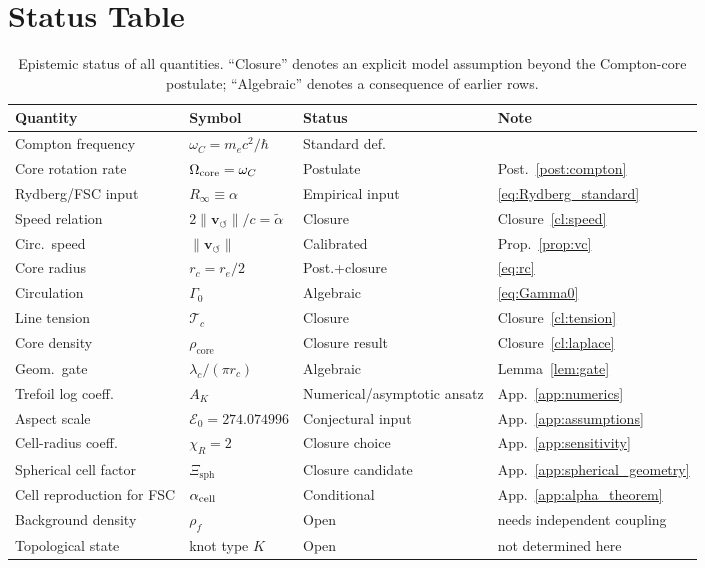 \documentclass[aps,pra,preprint,longbibliography,nofootinbib]{revtex4-2}
\newcommand{\vnorm}{\lVert\mathbf{v}_{\!\boldsymbol{\circlearrowleft}}\rVert} %
\newcommand{\rhof}{\rho_{\!f}}                   %
\newcommand{\rhocore}{\rho_{\mathrm{core}}}      %
\newcommand{\rc}{r_c}                            %
\newcommand{\omC}{\omega_C}                      %
\newcommand{\lc}{\lambda_c}                      %
\newcommand{\Rinf}{R_\infty}                     %
\newcommand{\Tc}{\mathcal{T}_c}                  %
\newcommand{\Gz}{\Gamma_0}                       %
\newcommand{\Et}{\mathcal{E}_0}                    %
\newcommand{\AK}{A_K}                                %
\newcommand{\Xsph}{\Xi_{\mathrm{sph}}}             %
\newcommand{\chiR}{\chi_R}                         %
\begin{document}
\section{Status Table}
\label{sec:status}

\begin{table}[h]
\centering
\caption{Epistemic status of all quantities.  ``Closure'' denotes an
explicit model assumption beyond the Compton-core postulate; ``Algebraic''
denotes a consequence of earlier rows.}
\label{tab:status}
\begin{tabular}{llll}
\toprule
Quantity & Symbol & Status & Note \\
\midrule
Compton frequency  & $\omC = m_e c^2/\hbar$     & Standard def.  & \cite{MohrTaylor2022} \\
Core rotation rate & $\Omega_{\rm core}=\omC$   & Postulate       & Post.~\ref{post:compton} \\
Rydberg/FSC input  & $\Rinf\equiv\alpha$        & Empirical input & \eqref{eq:Rydberg_standard} \\
Speed relation     & $2\vnorm/c=\tilde\alpha$   & Closure         & Closure~\ref{cl:speed} \\
Circ.\ speed       & $\vnorm$                   & Calibrated      & Prop.~\ref{prop:vc} \\
Core radius        & $\rc = r_e/2$              & Post.+closure   & \eqref{eq:rc} \\
Circulation        & $\Gz$                      & Algebraic       & \eqref{eq:Gamma0} \\
Line tension       & $\Tc$                      & Closure         & Closure~\ref{cl:tension} \\
Core density       & $\rhocore$                 & Closure result  & Closure~\ref{cl:laplace} \\
Geom.\ gate        & $\lc/(\pi\rc)$             & Algebraic       & Lemma~\ref{lem:gate} \\
Trefoil log coeff. & $\AK$                      & Numerical/asymptotic ansatz & App.~\ref{app:numerics} \\
Aspect scale       & $\Et=274.074996$          & Conjectural input & App.~\ref{app:assumptions} \\
Cell-radius coeff. & $\chiR=2$                  & Closure choice & App.~\ref{app:sensitivity} \\
Spherical cell factor & $\Xsph$                 & Closure candidate & App.~\ref{app:spherical_geometry} \\
Cell reproduction for FSC & $\alpha_{\rm cell}$ & Conditional     & App.~\ref{app:alpha_theorem} \\
Background density & $\rhof$                    & Open            & needs independent coupling \\
Topological state  & knot type $K$              & Open            & not determined here \\
\bottomrule
\end{tabular}
\end{table}
\end{document}
